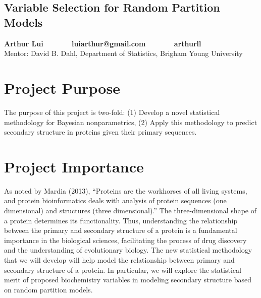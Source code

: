 \documentclass{article}
\begin{document}
\begin{center}
  \section*{Variable Selection for Random Partition Models}
  {\normalsize \textbf{Arthur Lui~~~~~~~luiarthur@gmail.com~~~~~~~arthurll}}\\
  {\footnotesize Mentor: David B. Dahl, Department of Statistics, Brigham Young University}
\end{center}

\section*{\normalsize Project Purpose}
The purpose of this project is two-fold: 
(1) Develop a novel statistical methodology for Bayesian nonparametrics,
(2) Apply this methodology to predict secondary structure in proteins
given their primary sequences.

\section*{\normalsize Project Importance}
  As noted by Mardia (2013), ``Proteins are the workhorses of all living systems, 
  and protein bioinformatics deals with analysis of protein 
  sequences (one dimensional) and structures (three dimensional).''
  The three-dimensional shape of a protein determines its functionality.
  Thus, understanding the relationship between the 
  primary and secondary structure of a protein is a fundamental importance
  in the biological sciences, facilitating the process
  of drug discovery and the understanding of evolutionary biology.
  The new statistical methodology that we will develop will help
  model the relationship between primary and secondary structure of a protein.
  In particular, we will explore the statistical merit of proposed biochemistry
  variables in modeling secondary structure based on random partition
  models.
\end{document}
